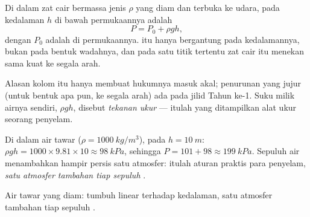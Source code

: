 \begin{theorem}\label{thm:g10:pressure:depth}
Di dalam zat cair bermassa jenis $\rho$ yang diam dan terbuka ke udara,
 pada kedalaman $h$ di bawah permukaannya adalah
\[
P = P_0 + \rho g h,
\]
dengan $P_0$ adalah  di permukaannya.  itu hanya
bergantung pada kedalamannya, bukan pada bentuk wadahnya, dan pada satu
titik tertentu zat cair itu menekan sama kuat ke segala arah.
\end{theorem}
\admitted

\begin{remark}
Alasan kolom itu hanya membuat hukumnya masuk akal; penurunan yang jujur
(untuk bentuk apa pun, ke segala arah) ada pada jilid Tahun ke-1. Suku
milik airnya sendiri, $\rho g h$, disebut \emph{tekanan
ukur} --- itulah yang ditampilkan alat ukur 
seorang penyelam.
\end{remark}

\begin{example}\label{ex:g10:pressure:tenmetres}
Di dalam air tawar ($\rho = \qty{1000}{kg/m^3}$), pada
$h = \qty{10}{m}$: $\rho g h = 1000 \times 9.81 \times 10 \approx \qty{98}{kPa}$, sehingga $P = 101 + 98 \approx \qty{199}{kPa}$. Sepuluh
 air menambahkan hampir persis satu atmosfer: itulah aturan praktis
para penyelam, \emph{satu atmosfer tambahan tiap sepuluh }.
\end{example}

\begin{omfigure}

{\small Air tawar yang diam:  tumbuh linear terhadap kedalaman, satu atmosfer tambahan tiap sepuluh .}
\end{omfigure}

